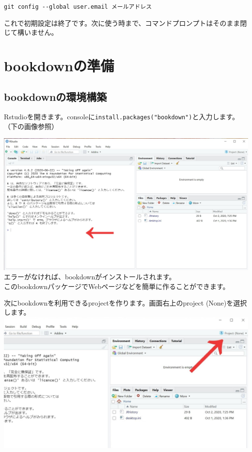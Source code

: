 \documentclass[
]{book}
\begin{document}
\begin{verbatim}
git config --global user.email メールアドレス
\end{verbatim}

これで初期設定は終了です。次に使う時まで、コマンドプロンプトはそのまま閉じて構いません。

\hypertarget{bookdownux306eux6e96ux5099}{%
\chapter{bookdownの準備}\label{bookdownux306eux6e96ux5099}}

\hypertarget{bookdownux306eux74b0ux5883ux69cbux7bc9}{%
\section{bookdownの環境構築}\label{bookdownux306eux74b0ux5883ux69cbux7bc9}}

Rstudioを開きます。consoleに\texttt{install.packages("bookdown")}と入力します。（下の画像参照）

\includegraphics{pics/Rstudio_console.jpg}
エラーがなければ、bookdownがインストールされます。\\
このbookdownパッケージでWebページなどを簡単に作ることができます。

次にbookdownを利用できるprojectを作ります。画面右上のproject (None)を選択します。
\includegraphics{pics/project.jpg}
\end{document}
